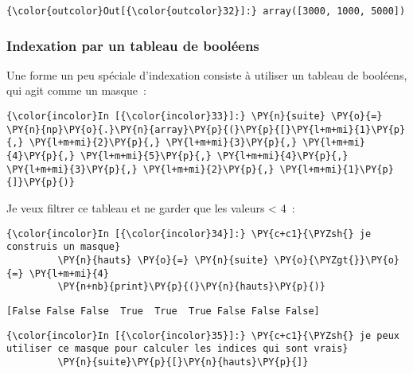 \begin{Verbatim}[commandchars=\\\{\},frame=single,framerule=0.3mm,rulecolor=\color{cellframecolor}]
{\color{outcolor}Out[{\color{outcolor}32}]:} array([3000, 1000, 5000])
\end{Verbatim}
            
    \hypertarget{indexation-par-un-tableau-de-booluxe9ens}{%
\subsubsection{Indexation par un tableau de
booléens}\label{indexation-par-un-tableau-de-booluxe9ens}}

    Une forme un peu spéciale d'indexation consiste à utiliser un tableau de
booléens, qui agit comme un masque~:

    \begin{Verbatim}[commandchars=\\\{\},frame=single,framerule=0.3mm,rulecolor=\color{cellframecolor}]
{\color{incolor}In [{\color{incolor}33}]:} \PY{n}{suite} \PY{o}{=} \PY{n}{np}\PY{o}{.}\PY{n}{array}\PY{p}{(}\PY{p}{[}\PY{l+m+mi}{1}\PY{p}{,} \PY{l+m+mi}{2}\PY{p}{,} \PY{l+m+mi}{3}\PY{p}{,} \PY{l+m+mi}{4}\PY{p}{,} \PY{l+m+mi}{5}\PY{p}{,} \PY{l+m+mi}{4}\PY{p}{,} \PY{l+m+mi}{3}\PY{p}{,} \PY{l+m+mi}{2}\PY{p}{,} \PY{l+m+mi}{1}\PY{p}{]}\PY{p}{)}
\end{Verbatim}


    Je veux filtrer ce tableau et ne garder que les valeurs \textless{} 4~:

    \begin{Verbatim}[commandchars=\\\{\},frame=single,framerule=0.3mm,rulecolor=\color{cellframecolor}]
{\color{incolor}In [{\color{incolor}34}]:} \PY{c+c1}{\PYZsh{} je construis un masque}
         \PY{n}{hauts} \PY{o}{=} \PY{n}{suite} \PY{o}{\PYZgt{}}\PY{o}{=} \PY{l+m+mi}{4}
         \PY{n+nb}{print}\PY{p}{(}\PY{n}{hauts}\PY{p}{)}
\end{Verbatim}


    \begin{Verbatim}[commandchars=\\\{\},frame=single,framerule=0.3mm,rulecolor=\color{cellframecolor}]
[False False False  True  True  True False False False]
\end{Verbatim}

    \begin{Verbatim}[commandchars=\\\{\},frame=single,framerule=0.3mm,rulecolor=\color{cellframecolor}]
{\color{incolor}In [{\color{incolor}35}]:} \PY{c+c1}{\PYZsh{} je peux utiliser ce masque pour calculer les indices qui sont vrais}
         \PY{n}{suite}\PY{p}{[}\PY{n}{hauts}\PY{p}{]}
\end{Verbatim}


